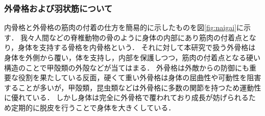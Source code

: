 \subsubsection{外骨格および羽状筋について}
内骨格と外骨格の筋肉の付着の仕方を簡易的に示したものを図\ref{fig:naigai}に示す．
我々人間などの脊椎動物の骨のように身体の内部にあり筋肉の付着点となり，身体を支持する骨格を内骨格という．
それに対して本研究で扱う外骨格は身体を外側から覆い，体を支持し，内部を保護しつつ，筋肉の付着点となる硬い構造のことで甲殻類の外殻などが当てはまる．
外骨格は外敵からの防御にも重要な役割を果たしている反面，硬くて重い外骨格は身体の屈曲性や可動性を阻害することが多いが，甲殻類，昆虫類などは外骨格に多数の関節を持つため運動性に優れている．
しかし身体は完全に外骨格で覆われており成長が妨げられるため定期的に脱皮を行うことで身体を大きくしている．

